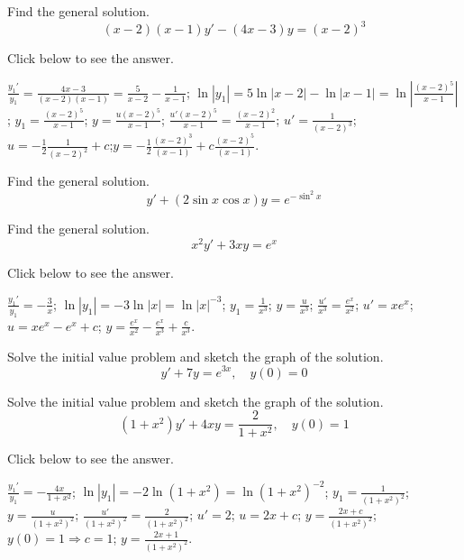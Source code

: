 \documentclass{ximera}
\begin{document}
\begin{problem}\label{exer:2.1.22} Find the general solution.
$$(x-2)(x-1)y'-(4x-3)y=(x-2)^3$$

Click below to see the answer.

\begin{expandable}
    $\frac{y_1'}{ y_1}=\frac{4x-3}{(x-2)(x-1)}=\frac{5}{
x-2}-\frac{1}{ x-1}$;\quad
$\ln|y_1|=5\ln|x-2|-\ln|x-1|=\ln\left|\frac{(x-2)^5}{
x-1}\right|$;\quad
$y_1=\frac{(x-2)^5}{ x-1}$;\quad
 $y=\frac{u(x-2)^5}{ x-1}$;\quad
$\frac{u'(x-2)^5}{ x-1}=\frac{(x-2)^2}{ x-1}$;\quad
$u'=\frac{1}{ (x-2)^3}$;\quad
$u=-\frac{1}{ 2}\frac{1}{(x-2)^2} +c$;\quad $y=-\frac{1}{
2}\frac{(x-2)^3}{ (x-1)}+c\frac{(x-2)^5}{ (x-1)}$.
\end{expandable}
\end{problem}

\begin{problem}\label{exer:2.1.23} Find the general solution.
$$y'+(2\sin x\cos x) y=e^{-\sin^2x}$$
\end{problem}

\begin{problem}\label{exer:2.1.24} Find the general solution.
$$x^2y'+3xy=e^x$$

Click below to see the answer.

\begin{expandable}
    $\frac{y_1'}{ y_1}=-\frac{3}{ x}$;\quad
$\ln|y_1|=-3\ln|x|=\ln|x|^{-3}$;\quad
$y_1=\frac{1}{ x^3}$;\quad
$y=\frac{u}{ x^3}$;\quad
$\frac{u'}{ x^3}=\frac{e^x}{ x^2}$;\quad
$u'=xe^x$;\quad
$u=xe^x-e^x+c$;\quad
$y=\frac{e^x}{ x^2}-\frac{e^x}{ x^3}+\frac{c}{ x^3}$.
\end{expandable}
\end{problem}

\begin{problem}\label{exer:2.1.25} Solve the
initial value problem and sketch the graph of the solution.
$$y'+7y=e^{3x},\quad y(0)=0$$
\end{problem}

\begin{problem}\label{exer:2.1.26} Solve the
initial value problem and sketch the graph of the solution.
$$(1+x^2)y'+4xy=\frac{2}{1+x^2},\quad y(0)=1$$

Click below to see the answer.

\begin{expandable}
    $\frac{y_1'}{y_1}=-\frac{4x}{1+x^2}$;\quad
$\ln|y_1|=-2\ln(1+x^2)=\ln(1+x^2)^{-2}$;\quad
$y_1=\frac{1}{(1+x^2)^2}$;\quad
$y=\frac{u}{(1+x^2)^2}$;\quad
$\frac{u'}{(1+x^2)^2}=\frac{2}{(1+x^2)^2}$;\quad
$u'=2$;\quad
$u=2x+c$;\quad
$y=\frac{2x+c}{(1+x^2)^2}$;\quad
$y(0)=1\Rightarrow c=1$;\quad
$y=\frac{2x+1}{(1+x^2)^2}$.
\end{expandable}
\end{problem}
\end{document}

